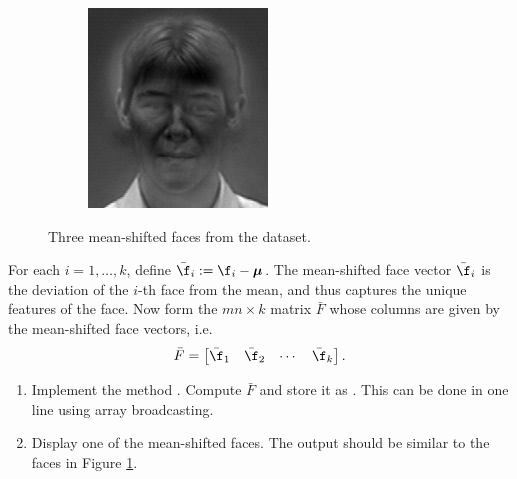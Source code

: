 \begin{figure}
\begin{subfigure}[b]{0.3\textwidth}
\end{subfigure}
\begin{subfigure}[b]{0.3\textwidth}
\includegraphics[width=\textwidth]{differenceFace2.png}
\end{subfigure}
\caption{Three mean-shifted faces from the dataset.}
\label{facialRecognition:differenceFaces}
\end{figure}
For each $i = 1,\ldots, k$, define $\bar{\f}_i := \f_i - {\boldsymbol \mu}$.
The mean-shifted face vector $\bar{\f}_i$ is the deviation of the $i$-th face from the mean, and thus captures the unique features of the face.
Now form the $mn \times k$ matrix $\bar{F}$ whose columns are given by the mean-shifted face vectors, i.e.
\[
\bar{F} = \begin{bmatrix}
\bar{\f}_1 & \bar{\f}_2 & \cdots & \bar{\f}_k
\end{bmatrix}.
\]
\begin{problem}
\leavevmode
\begin{enumerate}
\item Implement the method .
Compute $\bar{F}$ and store it as .
This can be done in one line using array broadcasting.
\item
Display one of the mean-shifted faces. 
The output should be similar to the faces in Figure \ref{facialRecognition:differenceFaces}.
\end{enumerate}
\end{problem}

